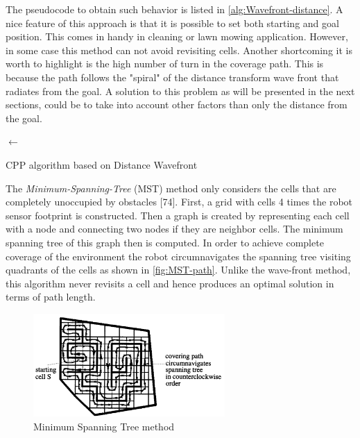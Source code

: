 The pseudocode to obtain such behavior is listed in \autoref{alg:Wavefront-distance}. 
A nice feature of this approach is that it is possible to set both starting and goal position. This comes in handy in cleaning or lawn mowing application. However, in some case this method can not avoid revisiting cells. Another shortcoming it is worth to highlight is the high number of turn in the coverage path. This is because the path follows the "spiral" of the distance transform wave front that radiates from the goal. A solution to this problem as will be presented in the next sections, could be to take into account other factors than only the distance from the goal.\par
\begin{algorithm}

	\BlankLine
	\SCell $\leftarrow$ \CCell \;
\caption{CPP algorithm based on Distance Wavefront}
\label{alg:Wavefront-distance}
\end{algorithm}
The \textit{Minimum-Spanning-Tree} (MST) method only considers the cells that are completely unoccupied by obstacles [74]. First, a grid with cells 4 times the robot sensor footprint is constructed. Then a graph is created by representing each cell with a node and connecting two nodes if they are neighbor cells. The minimum spanning tree of this graph then is computed. In order to achieve complete coverage of the environment the robot circumnavigates the spanning tree visiting quadrants of the cells as shown in \autoref{fig:MST-path}. Unlike the wave-front method, this algorithm never revisits a cell and hence produces an optimal solution in terms of path length. 
\begin{figure}[ht]
    \centering
    \includegraphics[width=0.65\textwidth]{figures/C3/MST-path.png}
    \caption{Minimum Spanning Tree method}
    \label{fig:MST-path}
\end{figure}

